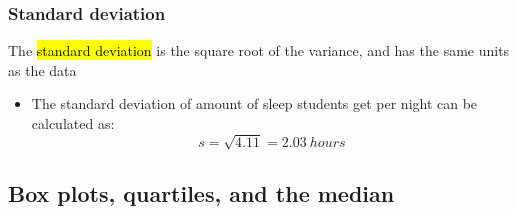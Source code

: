 
\begin{frame}
\frametitle{Standard deviation}

The \hl{standard deviation} is the square root of the variance, and has the same units as the data

\formula{
\[ s = \sqrt{s^2} \]
}

\pause

{
\begin{itemize}

\item The standard deviation of amount of sleep students get per night can be calculated as:
\[ s = \sqrt{4.11} = 2.03~hours\]

\end{itemize}
}
{
}

\end{frame}


\subsection{Box plots, quartiles, and the median}


